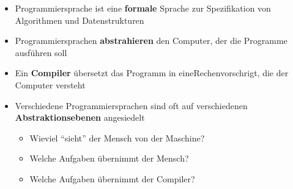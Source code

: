 \documentclass{gadsescript}
\begin{document}
\begin{itemize}
	\item Programmiersprache ist eine \textbf{formale} Sprache zur Spezifikation von Algorithmen und Datenstrukturen
	\item Programmiersprachen \textbf{abstrahieren} den Computer, der die Programme ausführen soll
	\item Ein \textbf{Compiler} übersetzt das Programm in eineRechenvorschrigt, die der Computer versteht
	\item Verschiedene Programmiersprachen sind oft auf verschiedenen \textbf{Abstraktionsebenen} angesiedelt
		\begin{itemize}
			\item Wieviel ``sieht'' der Mensch von der Maschine?
			\item Welche Aufgaben übernimmt der Mensch?
			\item Welche Aufgaben übernimmt der Compiler?
		\end{itemize}
\end{itemize}
\end{document}
